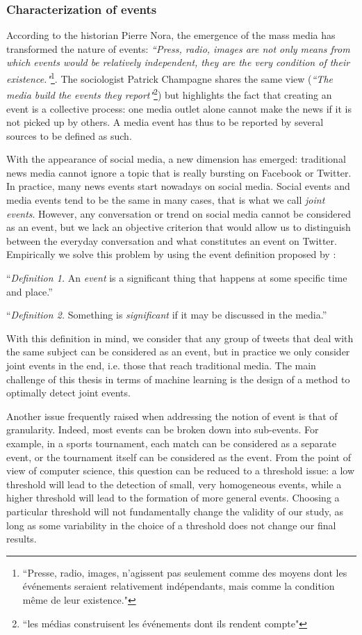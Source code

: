 \subsubsection{Characterization of events}
According to the historian Pierre Nora, the emergence of the mass media has transformed the nature of events: \textit{``Press, radio, images are not only means from which events would be relatively independent, they are the very condition of their existence."}\footnote{``Presse, radio, images, n'agissent pas seulement comme des moyens dont les événements seraient relativement indépendants, mais comme la condition même de leur existence."}\citep{nora_evenement_1972}. The sociologist Patrick Champagne \citep{champagne_evenement_2000} shares the same view (\textit{``The media build the events they report"}\footnote{``les médias construisent les événements dont ils rendent compte"}) but highlights the fact that creating an event is a collective process: one media outlet alone cannot make the news if it is not picked up by others. A media event has thus to be reported by several sources to be defined as such.

With the appearance of social media, a new dimension has emerged: traditional news media cannot ignore a topic that is really bursting on Facebook or Twitter. In practice, many news events start nowadays on social media.  Social events and media events tend to be the same in many cases, that is what we call \textit{joint events}. However, any conversation or trend on social media cannot be considered as an event, but we lack an objective criterion that would allow us to distinguish between the everyday conversation and what constitutes an event on Twitter. Empirically we solve this problem by using the event definition proposed by \cite{mcminn_building_2013}:

“\textit{Definition 1.} An \textit{event} is a significant thing that happens
at some specific time and place.”

“\textit{Definition 2.} Something is \textit{significant} if it may be discussed in the media.”

With this definition in mind, we consider that any group of tweets that deal with the same subject can be considered as an event, but in practice we only consider joint events in the end, i.e. those that reach traditional media. The main challenge of this thesis in terms of machine learning is the design of a method to optimally detect joint events.

Another issue frequently raised when addressing the notion of event is that of granularity. Indeed, most events can be broken down into sub-events. For example, in a sports tournament, each match can be considered as a separate event, or the tournament itself can be considered as the event. From the point of view of computer science, this question can be reduced to a threshold issue: a low threshold will lead to the detection of small, very homogeneous events, while a higher threshold will lead to the formation of more general events. Choosing a particular threshold will not fundamentally change the validity of our study, as long as some variability in the choice of a threshold does not change our final results.

